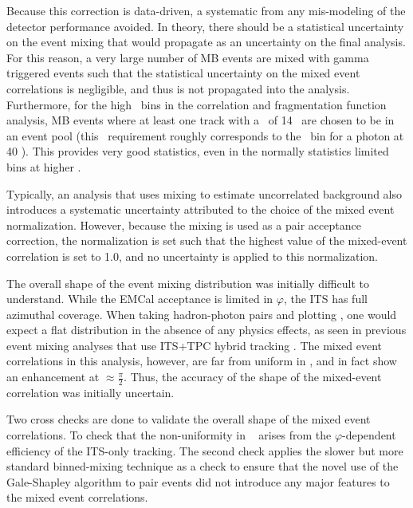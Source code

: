 Because this correction is data-driven, a systematic from any mis-modeling of the detector performance avoided. In theory, there should be a statistical uncertainty on the event mixing that would propagate as an uncertainty on the final analysis. For this reason, a very large number of MB events are mixed with gamma triggered events such that the statistical uncertainty on the mixed event correlations is negligible, and thus is not propagated into the analysis. Furthermore, for the high \zt~bins in the correlation and fragmentation function analysis, MB events where at least one track with a \pt~of 14 \GeVc~are chosen to be in an event pool (this \pt~requirement roughly corresponds to the \zt~bin for a photon at 40 \GeVc). This provides very good statistics, even in the normally statistics limited bins at higher \zt.

 Typically, an analysis that uses mixing to estimate uncorrelated background also introduces a systematic uncertainty attributed to the choice of the mixed event normalization. However, because the mixing is used as a pair acceptance correction, the normalization is set such that the highest value of the mixed-event correlation is set to 1.0, and no uncertainty is applied to this normalization.

 The overall shape of the event mixing distribution was initially difficult to understand. While the EMCal acceptance is limited in $\varphi$, the ITS has full azimuthal coverage. When taking hadron-photon pairs and plotting \deltaphi, one would expect a flat distribution in the absence of any physics effects, as seen in previous event mixing analyses that use ITS+TPC hybrid tracking \cite{Singh2021a}. The mixed event correlations in this analysis, however, are far from uniform in \deltaphi, and in fact show an enhancement at $\approx\frac{\pi}{2}$. Thus, the accuracy of the shape of the mixed-event correlation was initially uncertain.

Two cross checks are done to validate the overall shape of the mixed event correlations. To check that the non-uniformity in \deltaphi~ arises from the $\varphi$-dependent efficiency of the ITS-only tracking. The second check applies the slower but more standard binned-mixing technique as a check to ensure that the novel use of the Gale-Shapley algorithm to pair events did not introduce any major features to the mixed event correlations.

